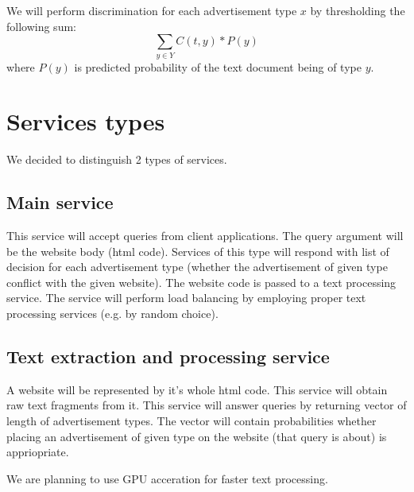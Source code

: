 \documentclass[a4paper]{article}
\begin{document}
We will perform discrimination for each advertisement type $x$
by thresholding the following sum:
\begin{equation}
    \sum_{y\in{Y}} {C(t, y) * P(y)}
\end{equation}
where $P(y)$ is predicted probability of the text document being of type $y$.



\section{Services types}
We decided to distinguish 2 types of services.

\subsection{Main service}
This service will accept queries from client applications.
The query argument will be the website body (html code).
Services of this type will respond with list of decision for each advertisement type
(whether the advertisement of given type conflict with the given website).
The website code is passed to a text processing service.
The service will perform load balancing by employing proper text processing services
(e.g. by random choice).


\subsection{Text extraction and processing service}
A website will be represented by it's whole html code.
This service will obtain raw text fragments from it.
This service will answer queries by returning vector of length of advertisement types.
The vector will contain probabilities whether placing an advertisement of given type
on the website (that query is about) is appriopriate.

We are planning to use GPU acceration for faster text processing.
\end{document}
